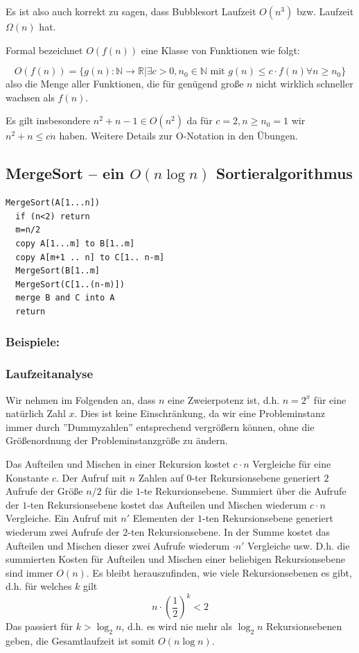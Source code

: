 \documentclass{article}
\begin{document}
Es ist also auch korrekt zu sagen, dass Bubblesort Laufzeit $O(n^3)$  bzw. Laufzeit $\Omega(n)$ hat.

Formal bezeichnet $O(f(n))$ eine Klasse von Funktionen wie folgt:

\[
	O(f(n))=\{ g(n):\mathbb{N}\rightarrow \mathbb{R} | \exists c>0, n_0\in\mathbb{N} \mbox{ mit } g(n)\leq c\cdot f(n) \forall n\geq n_0\}
\]
also die Menge aller Funktionen, die für genügend große $n$ nicht wirklich schneller wachsen als $f(n)$.

Es gilt insbesondere $n^2+n-1 \in O(n^2)$ da für $c=2, n\geq n_0=1$ wir $n^2+n\leq c\dot n$ haben.
Weitere Details zur O-Notation in den Übungen. %

\subsection{MergeSort -- ein $O(n\log n)$ Sortieralgorithmus}

\begin{verbatim}
MergeSort(A[1...n])
  if (n<2) return
  m=n/2
  copy A[1...m] to B[1..m]
  copy A[m+1 .. n] to C[1.. n-m]
  MergeSort(B[1..m]
  MergeSort(C[1..(n-m)])
  merge B and C into A 
  return
\end{verbatim}

\subsubsection{Beispiele:}

\subsubsection{Laufzeitanalyse}
Wir nehmen im Folgenden an, dass $n$ eine Zweierpotenz ist, d.h. $n=2^x$ für eine natürlich Zahl $x$. Dies ist keine Einschränkung,
da wir eine Probleminstanz immer durch ''Dummyzahlen'' entsprechend vergrößern können, ohne die Größenordnung der Probleminstanzgröße
zu ändern.

Das Aufteilen und Mischen in einer Rekursion kostet $c\cdot n$ Vergleiche für eine Konstante $c$. Der Aufruf mit $n$ Zahlen auf
$0$-ter Rekursionsebene generiert $2$ Aufrufe der Größe $n/2$ 
für die $1$-te Rekursionsebene. Summiert über die Aufrufe der $1$-ten Rekursionsebene kostet das Aufteilen und Mischen
wiederum $c\cdot n$ Vergleiche. Ein Aufruf mit $n'$ Elementen der $1$-ten Rekursionsebene generiert wiederum zwei Aufrufe der $2$-ten Rekursionsebene.
In der Summe kostet das Aufteilen und Mischen dieser zwei Aufrufe wiederum $\cdot n'$ Vergleiche usw. 
D.h. die summierten Kosten für Aufteilen und Mischen einer beliebigen Rekursionsebene sind immer $O(n)$. Es bleibt herauszufinden,
wie viele Rekursionsebenen es gibt, d.h. für welches $k$ gilt
\[
	n\cdot (\frac{1}{2})^k <2
\]
Das passiert für $k>\log_2 n$, d.h. es wird nie mehr als $\log_2 n$ Rekursionsebenen geben, die Gesamtlaufzeit ist somit $O(n\log n)$.
\end{document}
